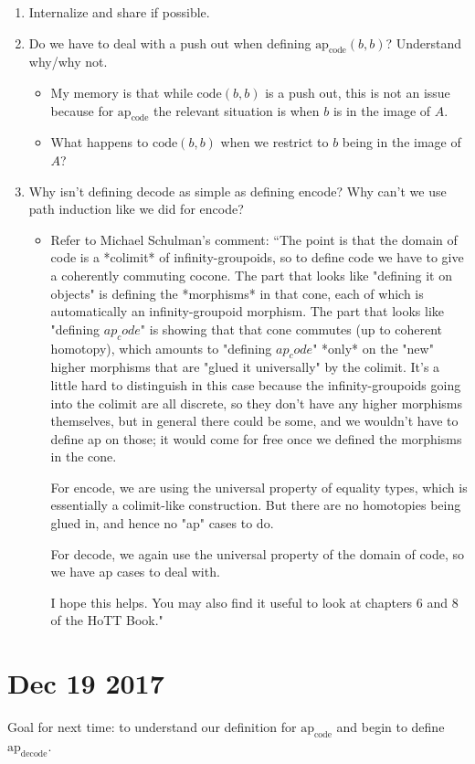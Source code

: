 \documentclass[11pt]{amsart}
\theoremstyle{remark}
\theoremstyle{definition}
\begin{document}
	\begin{enumerate}
	\item Internalize and share if possible.
	\item Do we have to deal with a push out when defining $\text{ap}_{\text{code}}(b, b)$? Understand why/why not.
		\begin{itemize}
		\item My memory is that while $\text{code}(b,b)$ is a push out, this is not an issue because for $\text{ap}_{\text{code}}$ the relevant situation is when $b$ is in the image of $A$.
		\item What happens to $\text{code}(b,b)$ when we restrict to $b$ being in the image of $A$?
		\end{itemize}
	\item Why isn't defining decode as simple as defining encode? Why can't we use path induction like we did for encode?
		\begin{itemize}
		\item Refer to Michael Schulman's comment: ``The point is that the domain of code is a *colimit* of
infinity-groupoids, so to define code we have to give a coherently
commuting cocone.  The part that looks like "defining it on objects"
is defining the *morphisms* in that cone, each of which is
automatically an infinity-groupoid morphism.  The part that looks like
"defining $ap_code$" is showing that that cone commutes (up to coherent
homotopy), which amounts to "defining $ap_code$" *only* on the "new"
higher morphisms that are "glued it universally" by the colimit.  It's
a little hard to distinguish in this case because the
infinity-groupoids going into the colimit are all discrete, so they
don't have any higher morphisms themselves, but in general there could
be some, and we wouldn't have to define ap on those; it would come for
free once we defined the morphisms in the cone.

For encode, we are using the universal property of equality types,
which is essentially a colimit-like construction.  But there are no
homotopies being glued in, and hence no "ap" cases to do.

For decode, we again use the universal property of the domain of code,
so we have ap cases to deal with.

I hope this helps.  You may also find it useful to look at chapters 6
and 8 of the HoTT Book."
		\end{itemize}
	\end{enumerate}
\section{Dec 19 2017}
Goal for next time: to understand our definition for $\text{ap}_{\text{code}}$ and begin to define $\text{ap}_{\text{decode}}$.



\end{document}
